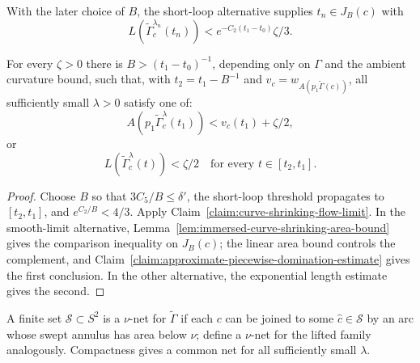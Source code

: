 \begin{remark}
\label{rem:short-loop-length-bound}
\label{xicomp}
With the later choice of $B$, the short-loop alternative supplies
$t_n\in J_B(c)$ with
\[
L(\widetilde\Gamma_c^{\lambda_n}(t_n))
<e^{-C_2(t_1-t_0)}\zeta/3.
\]
\end{remark}

\begin{lemma}
\label{lem:curve-deformation-single-point-estimate}
\label{xistronger}
For every $\zeta>0$ there is $B>(t_1-t_0)^{-1}$, depending only on $\Gamma$
and the ambient curvature bound, such that, with $t_2=t_1-B^{-1}$ and
$v_c=w_{A(p_1\widetilde\Gamma(c))}$, all sufficiently small $\lambda>0$
satisfy one of:
\[
A(p_1\widetilde\Gamma_c^\lambda(t_1))<v_c(t_1)+\zeta/2,
\]
or
\[
L(\widetilde\Gamma_c^\lambda(t))<\zeta/2
\quad\text{for every }t\in[t_2,t_1].
\]
\end{lemma}
\begin{proof}
\sketch Choose $B$ so that $3C_5/B\le\delta'$, the short-loop threshold propagates to
$[t_2,t_1]$, and $e^{C_2/B}<4/3$. Apply
Claim~\ref{claim:curve-shrinking-flow-limit}. In the smooth-limit alternative,
Lemma~\ref{lem:immersed-curve-shrinking-area-bound} gives the comparison
inequality on $J_B(c)$; the linear area bound controls the complement, and
Claim~\ref{claim:approximate-piecewise-domination-estimate} gives the first
conclusion. In the other alternative, the exponential length estimate gives
the second.
\end{proof}

A finite set ${\mathcal S}\subset S^2$ is a $\nu$-net for
$\widetilde\Gamma$ if each $c$ can be joined to some $\hat c\in{\mathcal S}$
by an arc whose swept annulus has area below $\nu$; define a $\nu$-net for the
lifted family analogously. Compactness gives a common net for all sufficiently
small $\lambda$.

